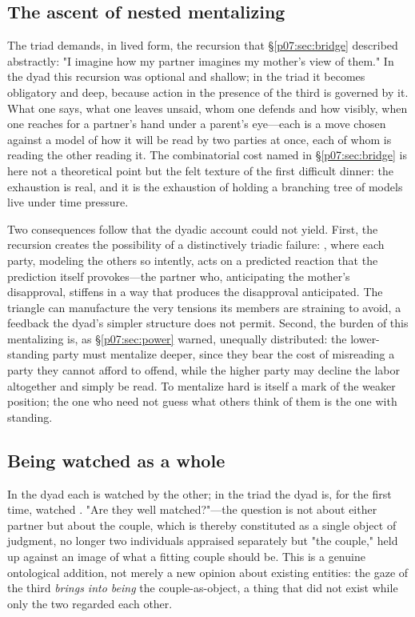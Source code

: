\documentclass[11pt,a4paper]{article}
\newcommand{\emb}[1]{\textcolor{rose}{\oldtextbf{#1}}}
\newcommand{\xref}[1]{\textcolor{rose}{\S\ref{#1}}}
\begin{document}
\subsection{The ascent of nested mentalizing}
The triad demands, in lived form, the recursion that \xref{p07:sec:bridge} described abstractly: "I imagine how my partner imagines my mother's view of them." In the dyad this recursion was optional and shallow; in the triad it becomes obligatory and deep, because action in the presence of the third is governed by it. What one says, what one leaves unsaid, whom one defends and how visibly, when one reaches for a partner's hand under a parent's eye---each is a move chosen against a model of how it will be read by two parties at once, each of whom is reading the other reading it. The combinatorial cost named in \xref{p07:sec:bridge} is here not a theoretical point but the felt texture of the first difficult dinner: the exhaustion is real, and it is the exhaustion of holding a branching tree of models live under time pressure.

Two consequences follow that the dyadic account could not yield. First, the recursion creates the possibility of a distinctively triadic failure: \emb{miscoordination through over-mentalizing}, where each party, modeling the others so intently, acts on a predicted reaction that the prediction itself provokes---the partner who, anticipating the mother's disapproval, stiffens in a way that produces the disapproval anticipated. The triangle can manufacture the very tensions its members are straining to avoid, a feedback the dyad's simpler structure does not permit. Second, the burden of this mentalizing is, as \xref{p07:sec:power} warned, unequally distributed: the lower-standing party must mentalize deeper, since they bear the cost of misreading a party they cannot afford to offend, while the higher party may decline the labor altogether and simply be read. To mentalize hard is itself a mark of the weaker position; the one who need not guess what others think of them is the one with standing.

\subsection{Being watched as a whole}
In the dyad each is watched by the other; in the triad the dyad is, for the first time, watched \emb{as a unit}. "Are they well matched?"---the question is not about either partner but about the couple, which is thereby constituted as a single object of judgment, no longer two individuals appraised separately but "the couple," held up against an image of what a fitting couple should be. This is a genuine ontological addition, not merely a new opinion about existing entities: the gaze of the third \emph{brings into being} the couple-as-object, a thing that did not exist while only the two regarded each other.
\end{document}
